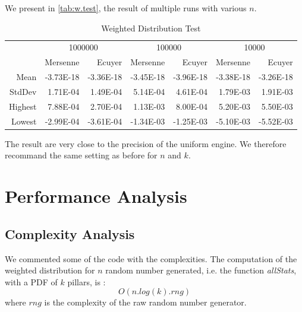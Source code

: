 \documentclass[12pt,a4paper,article]{memoir} %
\begin{document}
We present in \autoref{tab:w.test}, the result of multiple runs with various $n$.
\begin{table}[htbp!]
  \centering \tiny
    \begin{tabular}{r|rrrrrr}
    \multicolumn{1}{r}{} & \multicolumn{2}{c}{1000000} & \multicolumn{2}{c}{100000} & \multicolumn{2}{c}{10000} \\
    \multicolumn{1}{r}{} & Mersenne & Ecuyer & Mersenne & Ecuyer & Mersenne & Ecuyer \\
\cmidrule{2-7}    Mean  & -3.73E-18 & -3.36E-18 & -3.45E-18 & -3.96E-18 & -3.38E-18 & -3.26E-18 \\
    StdDev  & 1.71E-04 & 1.49E-04 & 5.14E-04 & 4.61E-04 & 1.79E-03 & 1.91E-03 \\
    Highest  & 7.88E-04 & 2.70E-04 & 1.13E-03 & 8.00E-04 & 5.20E-03 & 5.50E-03 \\
    Lowest  & -2.99E-04 & -3.61E-04 & -1.34E-03 & -1.25E-03 & -5.10E-03 & -5.52E-03 \\
    \end{tabular}%
  \caption{Weighted Distribution Test}
  \label{tab:w.test}%
\end{table}%
The result are very close to the precision of the uniform engine. 
We therefore recommand the same setting as before for $n$ and $k$.

\section{Performance Analysis}

\subsection{Complexity Analysis}
We commented some of the code with the complexities.
The computation of the weighted distribution for $n$ random number generated, 
i.e. the function \emph{allStats}, with a PDF of $k$ pillars, is :
\[
	O(n . log (k) . rng )
\]
where $rng$ is the complexity of the raw random number generator.
\end{document}
